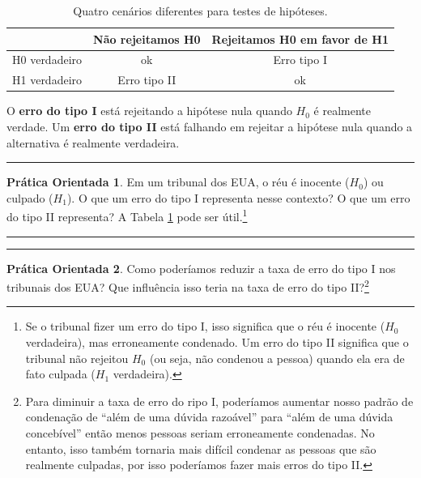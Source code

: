 \documentclass[
]{book}
\theoremstyle{definition}
\theoremstyle{definition}
\theoremstyle{definition}
\newtheorem{exercise}{Prática Orientada}[chapter]
\theoremstyle{definition}
\theoremstyle{remark}
\begin{document}
\begin{table}

\caption{\label{tab:fourHTScenarios}Quatro cenários diferentes para testes de hipóteses.}
\centering
\begin{tabular}[t]{l|c|c}
\hline
  & Não rejeitamos H0 & Rejeitamos H0 em favor de H1\\
\hline
H0 verdadeiro & ok & Erro tipo I\\
\hline
H1 verdadeiro & Erro tipo II & ok\\
\hline
\end{tabular}
\end{table}

O \textbf{erro do tipo I} está rejeitando a hipótese nula quando \(H_0\) é realmente verdade. Um \textbf{erro do tipo II} está falhando em rejeitar a hipótese nula quando a alternativa é realmente verdadeira.

\begin{center}\rule{0.5\linewidth}{0.5pt}\end{center}

\begin{exercise}
\protect\hypertarget{exr:tribunal1}{}{\label{exr:tribunal1} }Em um tribunal dos EUA, o réu é inocente (\(H_0\)) ou culpado (\(H_1\)). O que um erro do tipo I representa nesse contexto? O que um erro do tipo II representa? A Tabela \ref{tab:fourHTScenarios} pode ser útil.\footnote{Se o tribunal fizer um erro do tipo I, isso significa que o réu é inocente (\(H_0\) verdadeira), mas erroneamente condenado. Um erro do tipo II significa que o tribunal não rejeitou \(H_0\) (ou seja, não condenou a pessoa) quando ela era de fato culpada (\(H_1\) verdadeira).}
\end{exercise}

\begin{center}\rule{0.5\linewidth}{0.5pt}\end{center}

\begin{center}\rule{0.5\linewidth}{0.5pt}\end{center}

\begin{exercise}
\protect\hypertarget{exr:tribunal2}{}{\label{exr:tribunal2} }Como poderíamos reduzir a taxa de erro do tipo I nos tribunais dos EUA? Que influência isso teria na taxa de erro do tipo II?\footnote{Para diminuir a taxa de erro do ripo I, poderíamos aumentar nosso padrão de condenação de ``além de uma dúvida razoável'' para ``além de uma dúvida concebível'' então menos pessoas seriam erroneamente condenadas. No entanto, isso também tornaria mais difícil condenar as pessoas que são realmente culpadas, por isso poderíamos fazer mais erros do tipo II.}
\end{exercise}
\end{document}

